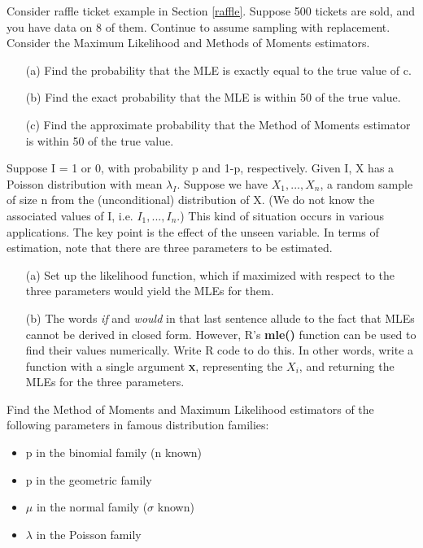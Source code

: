 \oneproblem
Consider raffle ticket example in Section \ref{raffle}. Suppose 500
tickets are sold, and you have data on 8 of them. Continue to assume
sampling with replacement.  Consider the Maximum Likelihood and Methods
of Moments estimators.

\begin{itemize}

\item [(a)] Find the probability that the MLE is exactly equal to the
true value of c. 

\item [(b)] Find the exact probability that the MLE is within 50 of the
true value. 

\item [(c)] Find the approximate probability that the Method of Moments
estimator is within 50 of the true value.

\end{itemize}

\oneproblem
Suppose I = 1 or 0, with probability p and 1-p, respectively. Given I,
X has a Poisson distribution with mean $\lambda_I$. Suppose we have        
$X_1,...,X_n$, a random sample of size n from the (unconditional)
distribution of X. (We do not know the associated values of I, i.e.
$I_1,...,I_n$.) This kind of situation occurs in various applications.
The key point is the effect of the unseen variable. In terms of
estimation, note that there are three parameters to be estimated.    

\begin{itemize}

\item [(a)] Set up the likelihood function, which if maximized with respect to
the three parameters would yield the MLEs for them.  

\item [(b)] The words {\it if} and {\it would} in that last sentence
allude to the fact    that MLEs cannot be derived in closed form.
However, R's {\bf mle()}  function can be used to find their values
numerically.  Write R code to do this.  In other words, write a function
with a single argument {\bf x}, representing the $X_i$, and returning
the MLEs for the three parameters.

\end{itemize}

\oneproblem
Find the Method of Moments and Maximum Likelihood estimators of the
following parameters in famous distribution families:

\begin{itemize}

\item p in the binomial family (n known)

\item p in the geometric family

\item $\mu$ in the normal family ($\sigma$ known)

\item $\lambda$ in the Poisson family

\end{itemize}

